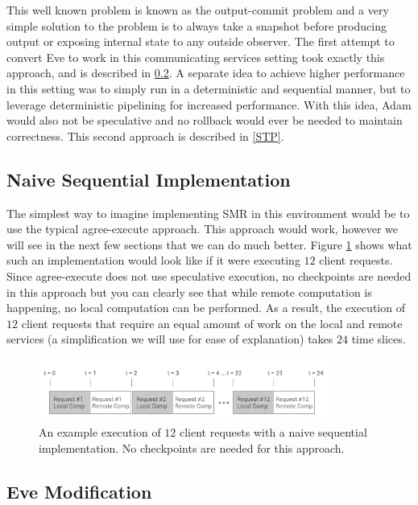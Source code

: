 \documentclass[11pt, oneside]{report}
\begin{document}
This well known problem is known as the output-commit problem and a very simple solution to the problem is to always take a snapshot before producing output or exposing internal state to any outside observer. 
The first attempt to convert Eve to work in this communicating services setting took exactly this approach, and is described in \ref{EveModification}. 
A separate idea to achieve higher performance in this setting was to simply run in a deterministic and sequential manner, but to leverage deterministic pipelining for increased performance. 
With this idea, Adam would also not be speculative and no rollback would ever be needed to maintain correctness. This second approach is described in \ref{STP}.

\subsection{Naive Sequential Implementation}

The simplest way to imagine implementing SMR in this environment would be to use the typical agree-execute approach.
This approach would work, however we will see in the next few sections that we can do much better. 
Figure \ref{NaiveSequential} shows what such an implementation would look like if it were executing $12$ client requests. 
Since agree-execute does not use speculative execution, no checkpoints are needed in this approach but you can clearly see that while remote computation is happening, no local computation can be performed.
As a result, the execution of $12$ client requests that require an equal amount of work on the local and remote services (a simplification we will use for ease of explanation) takes $24$ time slices.

\begin{figure}[h]
\centering
\includegraphics[width=0.85\textwidth]{NaiveSequential.png}
\caption{\label{NaiveSequential}An example execution of $12$ client requests with a naive sequential implementation. No checkpoints are needed for this approach.}
\end{figure}

\subsection{Eve Modification}\label{EveModification}
\end{document}
